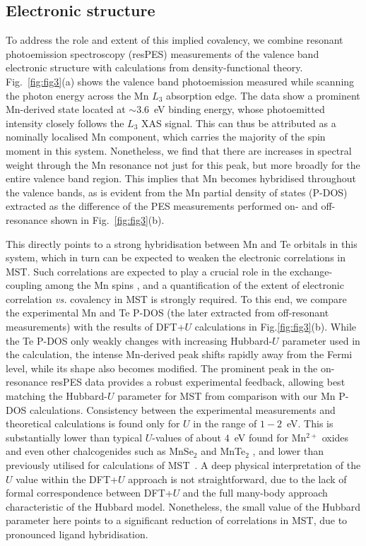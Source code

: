 \documentclass[preprint,amsmath,amssymb,aps,nofootinbib,superscriptaddress]{revtex4-2}
\begin{document}
\subsection{Electronic structure}
To address the role and extent of this implied covalency, we combine resonant photoemission spectroscopy (resPES) measurements of the valence band electronic structure with calculations from density-functional theory. Fig.~\ref{fig:fig3}(a) shows the valence band photoemission measured while scanning the photon energy across the Mn $L_3$ absorption edge. The data show a prominent Mn-derived state located at $\sim3.6$~eV binding energy, whose photoemitted intensity closely follows the $L_3$ XAS signal. This can thus be attributed as a nominally localised Mn component, which carries the majority of the spin moment in this system. Nonetheless, we find that there are increases in spectral weight through the Mn resonance not just for this peak, but more broadly for the entire valence band region. This implies that Mn becomes hybridised throughout the valence bands, as is evident from the Mn partial density of states (P-DOS) extracted as the difference of the PES measurements performed on- and off- resonance shown in Fig.~\ref{fig:fig3}(b). 

This directly points to a strong hybridisation between Mn and Te orbitals in this system, which in turn can be expected to weaken the electronic correlations in MST. Such correlations are expected to play a crucial role in the exchange-coupling among the Mn spins \cite{Nature2021Seo,PRB2017May,PRB2021Ni,PRB2021Liu},
and a quantification of the extent of electronic correlation {\it vs.} covalency in MST is strongly required. To this end, we compare the experimental Mn and Te P-DOS (the later extracted from off-resonant measurements) with the results of DFT+$U$ calculations in Fig.\ref{fig:fig3}(b). While the Te P-DOS only weakly changes with increasing Hubbard-$U$ parameter used in the calculation, the intense Mn-derived peak shifts rapidly away from the Fermi level, while its shape also becomes modified. The prominent peak in the on-resonance resPES data provides a robust experimental feedback, allowing  best matching the Hubbard-$U$ parameter for MST from comparison with our Mn P-DOS calculations. Consistency between the experimental measurements and theoretical calculations is found only for $U$ in the range of $1-2$~eV. This is substantially lower than typical $U$-values of about $4$~eV found for Mn$^{2+}$ oxides \cite{PRB2007Franchini} and even other chalcogenides such as MnSe$_2$ \cite{JPCM2021Xie} and MnTe$_2$ \cite{JAC2022Ma}, and lower than previously utilised for calculations of MST~\cite{PRB2017May,PRB2022Wang}. A deep physical interpretation of the $U$ value within the DFT+$U$ approach is not straightforward, due to the lack of formal correspondence between DFT+$U$ and the full many-body approach characteristic of the Hubbard model. Nonetheless, the small value of the Hubbard parameter here points to a significant reduction of correlations in MST, due to pronounced ligand hybridisation.
\end{document}
